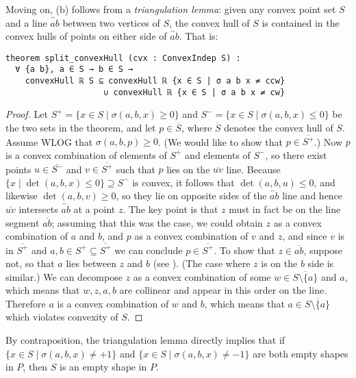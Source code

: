 Moving on, (b) follows from a \emph{triangulation lemma}:
given any convex point set $S$
and a line $\overleftrightarrow{ab}$ between two vertices of $S$,
the convex hull of $S$ is contained in the convex hulls
of points on either side of $\overleftrightarrow{ab}$.
That is:
\begin{lstlisting}
theorem split_convexHull (cvx : ConvexIndep S) :
  ∀ {a b}, a ∈ S → b ∈ S →
    convexHull ℝ S ⊆ convexHull ℝ {x ∈ S | σ a b x ≠ ccw}
                    ∪ convexHull ℝ {x ∈ S | σ a b x ≠ cw}
\end{lstlisting}

\begin{proof}
    Let $S^+=\{x\in S\mid \sigma(a,b,x)\ge 0\}$ and $S^-=\{x\in S\mid \sigma(a,b,x)\le 0\}$ be the two sets in the theorem, and let $p\in \overline{S}$, where $\overline{S}$ denotes the convex hull of $S$. Assume WLOG that $\sigma(a,b,p)\ge 0$. (We would like to show that $p\in \overline{S^+}$.) Now $p$ is a convex combination of elements of $S^+$ and elements of $S^-$, so there exist points $u\in \overline{S^-}$ and $v\in \overline{S^+}$ such that $p$ lies on the $\overline{uv}$ line.
%
    Because $\{x\mid \det(a,b,x)\le 0\}\supseteq S^-$ is convex, it follows that $\det(a,b,u)\le 0$, and likewise $\det(a,b,v)\ge 0$, so they lie on opposite sides of the $\overleftrightarrow{ab}$ line and hence $\overline{uv}$ intersects $\overleftrightarrow{ab}$ at a point $z$. The key point is that $z$ must in fact be on the line segment $\overline{ab}$; assuming that this was the case, we could obtain $z$ as a convex combination of $a$ and $b$, and $p$ as a convex combination of $v$ and $z$, and since $v$ is in $\overline{S^+}$ and $a,b\in S^+\subseteq\overline{S^+}$ we can conclude $p\in \overline{S^+}$.
%
    To show that $z\in \overline{ab}$, suppose not, so that $a$ lies between $z$ and $b$ (see ). (The case where $z$ is on the $b$ side is similar.) We can decompose $z$ as a convex combination of some $w\in \overline{S\setminus\{a\}}$ and $a$, which means that $w,z,a,b$ are collinear and appear in this order on the line. Therefore $a$ is a convex combination of $w$ and $b$, which means that $a\in \overline{S\setminus\{a\}}$ which violates convexity of $S$.
\end{proof}

\noindent
By contraposition,
the triangulation lemma directly implies that
if $\{x \in S \mid \sigma(a,b,x) \neq +1\}$ and $\{x \in S \mid \sigma(a,b,x) \neq -1\}$
are both empty shapes in $P$,
then $S$ is an empty shape in $P$.

